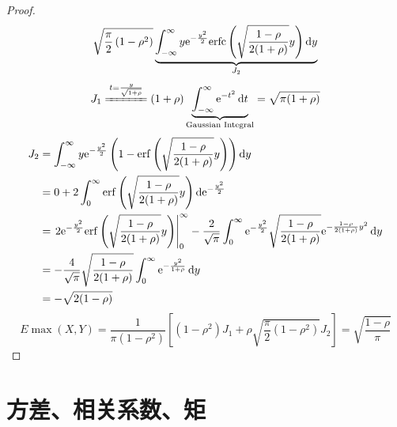 \begin{proof}
\begin{align*}
        \sqrt{\frac{\pi}{2}\left( 1-\rho^{2} \right)}
        \underbrace{\int_{-\infty }^{\infty } y\e^{-\frac{y^{2}}{2}}
            \erfc\left( \sqrt{\frac{1-\rho}{2(1+\rho)}}y
        \right) \d{y}}_{J_{2}}
    \end{align*}
    \[
        J_{1} \xlongequal{t=\frac{y}{\sqrt{1+\rho}}}
        (1+\rho)\underbrace{\int_{-\infty }^{\infty }
        \e^{-t^{2}}\d{t}}_{\text{Gaussian Integral}}=
        \sqrt{\pi(1+\rho)}
    \]
    \begin{align*}
        J_{2} &= \int_{-\infty}^{\infty }
        y\e^{-\frac{y^{2}}{2}} \left( 1-\erf\left(
        \sqrt{\frac{1-\rho}{2(1+\rho)}}y \right) \right) \d{y}\\
        &= 0+ 2\int_{0}^{\infty } \erf\left(
        \sqrt{\frac{1-\rho}{2(1+\rho)}}y \right)
        \d{\e^{-\frac{y^{2}}{2}} }\\
        &= \left. 2\e^{-\frac{y^{2}}{2}} \erf\left(
        \sqrt{\frac{1-\rho}{2(1+\rho)}}y \right)
        \right|_{0}^{\infty} - \frac{2}{\sqrt{\pi}} \int_{0}^{\infty }
        \e^{-\frac{y^{2}}{2}}
        \sqrt{\frac{1-\rho}{2(1+\rho)}}
        \e^{-\frac{1-\rho}{2(1+\rho)}y^{2}} \d{y}\\
        &= -\frac{4}{\sqrt{\pi}}
        \sqrt{\frac{1-\rho}{2(1+\rho)}} \int_{0}^{\infty}
        \e^{-\frac{y^{2}}{1+\rho}}  \d{y}\\
        &= -\sqrt{2(1-\rho)}
    \end{align*}
    \[
        E\max(X,Y) = \frac{1}{\pi\left( 1-\rho^{2} \right)}
        \left[ \left( 1-\rho^{2} \right)J_{1} +
            \rho\sqrt{\frac{\pi}{2}\left( 1-\rho^{2}
        \right)}J_{2} \right] = \sqrt{\frac{1-\rho}{\pi}}
    \]
\end{proof}
\section{方差、相关系数、矩}
